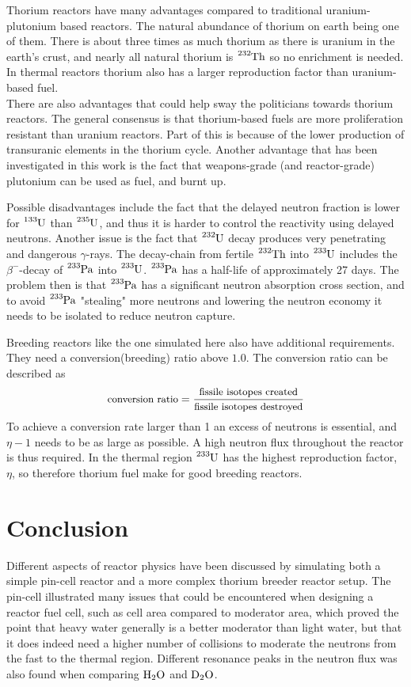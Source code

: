 \documentclass[norsk,a4paper,12pt]{article}
\begin{document}
\begin{multicols}{2}
Thorium reactors have many advantages compared to traditional uranium-plutonium based reactors\cite{nuclpowerthorium}. The natural abundance of thorium on earth being one of them. There is about three times as much thorium as there is uranium in the earth's crust, and nearly all natural thorium is $\ce{^{232}Th}$ so no enrichment is needed. In thermal reactors thorium also has a larger reproduction factor than uranium-based fuel. 
\\
There are also advantages that could help sway the politicians towards thorium reactors. The general consensus is that thorium-based fuels are more proliferation resistant than uranium reactors. Part of this is because of the lower production of transuranic elements in the thorium cycle. Another advantage that has been investigated in this work is the fact that weapons-grade (and reactor-grade) plutonium can be used as fuel, and burnt up. 

Possible disadvantages include the fact that the delayed neutron fraction is lower for $\ce{^{133}U}$ than $\ce{^{235}U}$, and thus it is harder to control the reactivity using delayed neutrons. Another issue is the fact that $\ce{^{232}U}$ decay produces very penetrating and dangerous $\gamma$-rays. The decay-chain from fertile $\ce{^{232}Th}$ into $\ce{^{233}U}$ includes the $\beta^-$-decay of $\ce{^{233}Pa}$ into $\ce{^{233}U}$. $\ce{^{233}Pa}$ has a half-life of approximately 27 days. The problem then is that $\ce{^{233}Pa}$ has a significant neutron absorption cross section, and to avoid $\ce{^{233}Pa}$ "stealing" more neutrons and lowering the neutron economy it needs to be isolated to reduce neutron capture.

Breeding reactors like the one simulated here also have additional requirements. They need a conversion(breeding) ratio above $1.0$. The conversion ratio can be described as
\begin{equation*}
    \text{\small{conversion ratio}} = \frac{\text{\small{fissile isotopes created}}}{\text{\small{fissile isotopes destroyed}}}
\end{equation*}
To achieve a conversion rate larger than 1 an excess of neutrons is essential, and $\eta - 1$ needs to be as large as possible. A high neutron flux throughout the reactor is thus required. In the thermal region $\ce{^{233}U}$ has the highest reproduction factor, $\eta$, so therefore thorium fuel make for good breeding reactors.


\section{Conclusion}
Different aspects of reactor physics have been discussed by simulating both a simple pin-cell reactor and a more complex thorium breeder reactor setup. The pin-cell illustrated many issues that could be encountered when designing a reactor fuel cell, such as cell area compared to moderator area, which proved the point that heavy water generally is a better moderator than light water, but that it does indeed need a higher number of collisions to moderate the neutrons from the fast to the thermal region. Different resonance peaks in the neutron flux was also found when comparing $\ce{H_2O}$ and $\ce{D_2O}$. 


\end{multicols}
\end{document}
